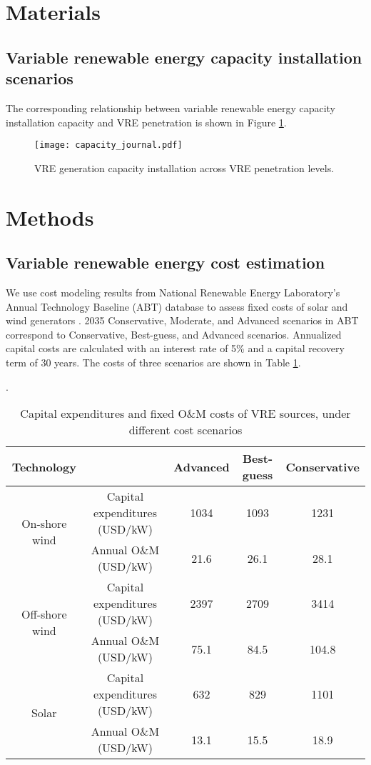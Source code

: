 \documentclass[9pt,twoside,lineno]{pnas-new}
\begin{document}


\section*{Materials}
\subsection{Variable renewable energy capacity installation scenarios}

The corresponding relationship between variable renewable energy capacity installation capacity and VRE penetration is shown in Figure \ref{fig:capacityexp}.

\begin{figure}[!ht]
    \centering
    \texttt{[image: capacity\_journal.pdf]}
    \caption{VRE generation capacity installation across VRE penetration levels.}
    \label{fig:capacityexp}
\end{figure}

\section*{Methods}
\subsection{Variable renewable energy cost estimation}

We use cost modeling results from National Renewable Energy Laboratory's Annual Technology Baseline (ABT) database to assess fixed costs of solar and wind generators \cite{vimmerstedt_2022_2022}. 2035 Conservative, Moderate, and Advanced scenarios in ABT correspond to Conservative, Best-guess, and Advanced scenarios. Annualized capital costs are calculated with an interest rate of 5\% and a capital recovery term of 30 years. The costs of three scenarios are shown in Table \ref{tab:costs}.

\begin{table}[H]\label{fig:mix}
    \caption{Capital expenditures and fixed O\&M costs of VRE sources, under different cost scenarios \cite{vimmerstedt_2022_2022}}.
    \centering
    \begin{tabular}{ccccc}
    \hline
    Technology &  & Advanced & Best-guess & Conservative \\ \hline
    \multirow{2}{*}{On-shore wind} & Capital expenditures (USD/kW) & 1034 & 1093 & 1231 \\
     & Annual O\&M (USD/kW) & 21.6 & 26.1 & 28.1 \\
    \multirow{2}{*}{Off-shore wind} & Capital expenditures (USD/kW) & 2397 & 2709 & 3414 \\
     & Annual O\&M (USD/kW) & 75.1 & 84.5 & 104.8 \\
    \multirow{2}{*}{Solar} & Capital expenditures (USD/kW) & 632 & 829 & 1101 \\
     & Annual O\&M (USD/kW) & 13.1 & 15.5 & 18.9 \\ \cline{1-5} 
    \end{tabular}
    \label{tab:costs}
\end{table}
\end{document}
